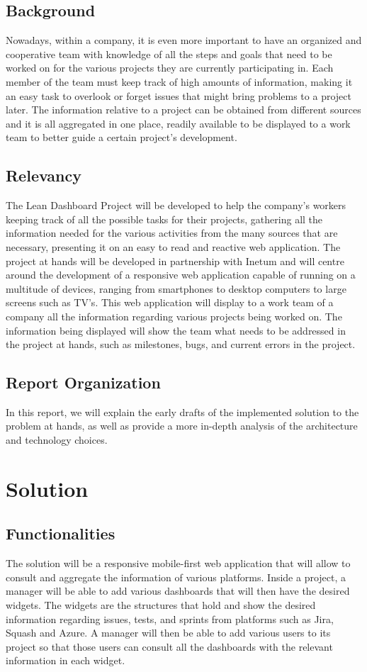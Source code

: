 \documentclass[a4paper,twoside,10pt]{report}
\begin{document}
\section{Background}
Nowadays, within a company, it is even more important to have an organized and cooperative team with knowledge of all the steps and goals that need to be worked on for the various projects they are currently participating in.
Each member of the team must keep track of high amounts of information, making it an easy task to overlook or forget issues that might bring problems to a project later. 
The information relative to a project can be obtained from different sources and it is all aggregated in one place, readily available to be displayed to a work team to better guide a certain project's development.

\section{Relevancy}
The Lean Dashboard Project will be developed to help the company's workers keeping track of all the possible tasks for their projects, gathering all the information needed for the various activities from the many sources that are necessary, presenting it on an easy to read and reactive web application.
The project at hands will be developed in partnership with Inetum\cite{INETUM} and will centre around the development of a responsive web application capable of running on a multitude of devices, ranging from smartphones to desktop computers to large screens such as TV’s. This web application will display to a work team of a company all the information regarding various projects being worked on. 
The information being displayed will show the team what needs to be addressed in the project at hands, such as milestones, bugs, and current errors in the project.

\section{Report Organization}
In this report, we will explain the early drafts of the implemented solution to the problem at hands, as well as provide a more in-depth analysis of the architecture and technology choices.

\chapter{Solution}

\section{Functionalities}
The solution will be a responsive mobile-first web application that will allow to consult and aggregate the information of various platforms. Inside a project, a manager will be able to add various dashboards that will then have the desired widgets. The widgets are the structures that hold and show the desired information regarding issues, tests, and sprints from platforms such as Jira, Squash and Azure. A manager will then be able to add various users to its project so that those users can consult all the dashboards with the relevant information in each widget.
\end{document}
